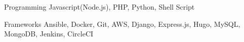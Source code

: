 

\begin{cvskills}

  \cvskill
    {Programming} %
    {Javascript(Node.js), PHP, Python, Shell Script} %

  \cvskill
    {Frameworks} %
    {Ansible, Docker, Git, AWS, Django, Express.js, Hugo, MySQL, MongoDB, Jenkins, CircleCI} %


\end{cvskills}
